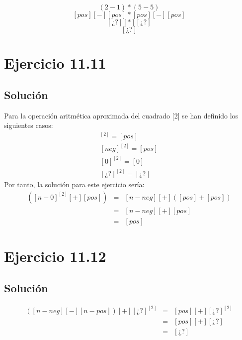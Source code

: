 \documentclass[11pt, a4paper, titlepage]{article}
\begin{document}
$$(2-1) * (5-5)$$
$$[pos] [-] [pos] * [pos] [-] [pos]$$
$$[¿?] [*] [¿?]$$
$$[¿?]$$

\section*{Ejercicio 11.11}
\subsection*{Solución}
Para la operación aritmética aproximada del cuadrado [2] se han definido los
siguientes casos:
\newline
\begin{align*}
  [pos]^{[2]} = [pos]\\
  [neg]^{[2]} = [pos]\\
  [0]^{[2]} = [0]\\
  [¿?]^{[2]} = [¿?]
\end{align*}
Por tanto, la solución para este ejercicio sería:
\begin{align*}
  [ns-neg][+]([n-0]^{[2]}[+][pos]) & = & [n-neg][+]([pos]+[pos])
  \\
  & = & [n-neg][+][pos]
  \\
  & = &[pos]
\end{align*}
\section*{Ejercicio 11.12}
\subsection*{Solución}
\begin{align*}
  ([n-neg][−][n-pos])[+][¿?]^{[2]} & = & [pos][+][¿?]^{[2]}
  \\
  & = & [pos][+][¿?]
  \\
  & = & [¿?]
\end{align*}
\end{document}
